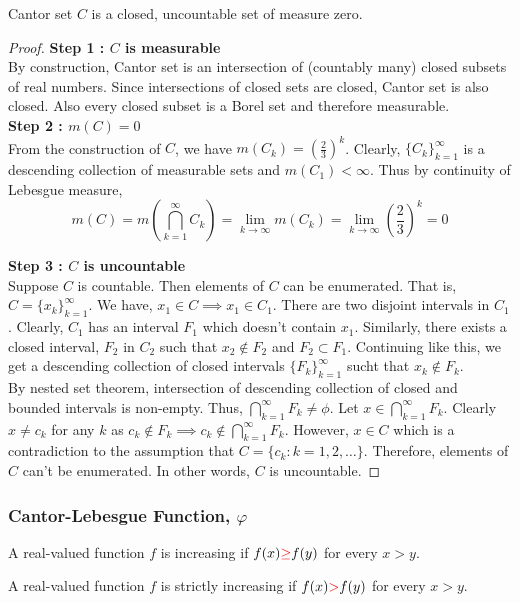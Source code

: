 \begin{theorem}
	Cantor set $C$ is a closed, uncountable set of measure zero.
\end{theorem}
\begin{proof}
	\textbf{Step 1 : $C$ is measurable}\\
	By construction, Cantor set is an intersection of (countably	many) closed subsets of real numbers.
	Since intersections of closed sets are closed, Cantor set is also closed.
	Also every closed subset is a Borel set and therefore measurable.\\

	\textbf{Step 2 : $m(C) = 0$}\\
	From the construction of $C$,
	we have $m(C_k) = \left( \frac{2}{3} \right)^k$.
	Clearly, $\{ C_k \}_{k=1}^\infty$ is a descending collection of measurable sets and $m(C_1) < \infty$.
	Thus by continuity of Lebesgue measure, 
	\[ m(C) = m \left( \bigcap_{k=1}^\infty C_k \right) =  \lim_{k \to \infty} m(C_k) = \lim_{k \to \infty} \left( \frac{2}{3} \right)^k = 0 \]

	\textbf{Step 3 : $C$ is uncountable}\\
	Suppose $C$ is countable.
	Then elements of $C$ can be enumerated.
	That is, $C = \{ x_k \}_{k=1}^\infty$.
	We have, $x_1  \in C \implies x_1 \in C_1$.
	There are two disjoint intervals in $C_1$.
	Clearly, $C_1$ has an interval $F_1$ which doesn't contain $x_1$.
	Similarly, there exists a closed interval, $F_2$ in  $C_2$ such that $x_2 \notin F_2$ and $F_2 \subset F_1$.
	Continuing like this, we get a descending collection of closed intervals $\{ F_k \}_{k=1}^\infty$ sucht that $x_k \notin F_k$.\\

	By nested set theorem, intersection of descending collection of closed and bounded intervals is non-empty.
	Thus, $\displaystyle \bigcap_{k=1}^\infty F_k \ne \phi$.
	Let $x \in \displaystyle \bigcap_{k=1}^\infty F_k$.
	Clearly $x \ne c_k$ for any $k$ as $\displaystyle c_k \notin F_k \implies c_k \notin \bigcap_{k=1}^\infty F_k$.
	However, $x \in C$ which is a contradiction to the assumption that $C = \{ c_k : k = 1,2,\dots \}$.
	Therefore, elements of $C$ can't be enumerated.
	In other words, $C$ is uncountable.
\end{proof}

\subsubsection{Cantor-Lebesgue Function, $\varphi$}
\begin{definition}[increasing]
	A real-valued function $f$ is increasing if $f(x) {\color{red}\ge} f(y)$ for every $x > y$.
\end{definition}
\begin{definition}
	A real-valued function $f$ is strictly increasing if $f(x) {\color{red}>} f(y)$ for every $x > y$.
\end{definition}

